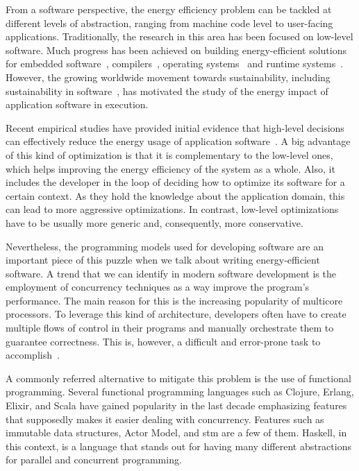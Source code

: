 From a software perspective, the energy efficiency problem can be tackled at different levels of abstraction, ranging from machine code level to user-facing applications. Traditionally, the research in this area has been focused on low-level software. Much progress has been achieved on building energy-efficient solutions for embedded software~\cite{tiwari:1994}, compilers~\cite{hsu:2003}, operating systems~\cite{merkel:2006} and runtime systems~\cite{ribic:2014, farkas:2000}. However, the growing worldwide movement towards sustainability, including sustainability in software~\cite{becker:2015}, has motivated the study of the energy impact of application software in execution.

Recent empirical studies have provided initial evidence that high-level decisions can effectively reduce the energy usage of application software~\cite{hindle:2012,trefethen:2013,pinto:2014,sahin:2014}. A big advantage of this kind of optimization is that it is complementary to the low-level ones, which helps improving the energy efficiency of the system as a whole. Also, it includes the developer in the loop of deciding how to optimize its software for a certain context. As they hold the knowledge about the application domain, this can lead to more aggressive optimizations. In contrast, low-level optimizations have to be usually more generic and, consequently, more conservative.

Nevertheless, the programming models used for developing software are an important piece of this puzzle when we talk about writing energy-efficient software. A trend that we can identify in modern software development is the employment of concurrency techniques as a way improve the program's performance. The main reason for this is the increasing popularity of multicore processors. To leverage this kind of architecture, developers often have to create multiple flows of control in their programs and manually orchestrate them to guarantee correctness. This is, however, a difficult and error-prone task to accomplish~\cite{sutter:2005,herlihy:2012}.

A commonly referred alternative to mitigate this problem is the use of functional programming. Several functional programming languages such as Clojure, Erlang, Elixir, and Scala have gained popularity in the last decade emphasizing features that supposedly makes it easier dealing with concurrency. Features such as immutable data structures, Actor Model, and \acl{stm} are a few of them. Haskell, in this context, is a language that stands out for having many different abstractions for parallel and concurrent programming.


